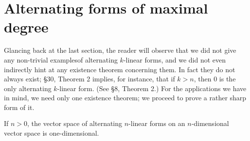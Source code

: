 \section{Alternating forms of maximal degree}

Glancing back at the last section, the reader will observe that we did not give
any non-trivial examplesof alternating \(k\)-linear forms, and we did not even
indirectly hint at any existence theorem concerning them. In fact they do not
always exist; §30, Theorem 2 implies, for instance, that if \(k>n\), then \(0\)
is the only alternating \(k\)-linear form. (See §8, Theorem 2.) For the
applications we have in mind, we need only one existence theorem; we proceed to
prove a rather sharp form of it.

\begin{thmx}
    If \(n > 0\), the vector space of alternating \(n\)-linear forms on an 
    \(n\)-dimensional vector space is one-dimensional.
\end{thmx}

